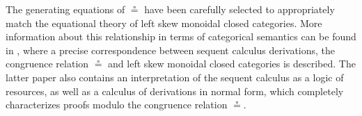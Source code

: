 \documentclass[sn-mathphys-num]{sn-jnl}%
\newcommand{\GG}{\Gamma}
\newcommand{\GD}{\Delta}
\newcommand{\tl}{\otimes \mathsf{L}}
\newcommand{\tr}{\otimes\mathsf{R}}
\newcommand{\pass}{\mathsf{pass}}
\newcommand{\unitl}{\mathsf{IL}}
\newcommand{\ax}{\mathsf{ax}}
\newcommand{\lolli}{\multimap}
\newcommand{\lleft}{{\lolli}\mathsf{L}}
\newcommand{\lright}{{\lolli}\mathsf{R}}
\theoremstyle{thmstyleone}%
\theoremstyle{thmstyletwo}%
\theoremstyle{thmstylethree}%
\begin{document}

The generating equations of $\circeq$ have been carefully selected to appropriately match the equational theory of left skew monoidal closed categories. More information about this relationship in terms of categorical semantics can be found in \cite{UVW:protsn}, where a precise correspondence between sequent calculus derivations, the congruence relation $\circeq$ and left skew monoidal closed categories is described.
The latter paper also contains an interpretation of the sequent calculus as a logic of resources, as well as a calculus of derivations in normal form, which completely characterizes proofs modulo the congruence relation $\circeq$.
\end{document}
